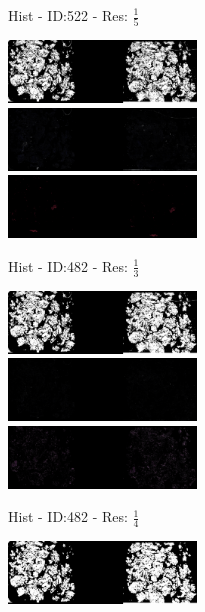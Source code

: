 \documentclass[letterpaper,10pt,oneside]{article}
\begin{document}
\begin{figure}[hbtp]
\begin{subfigure}[b]{5cm}
    \caption{Hist - ID:522 - Res: $\frac{1}{5}$}
  \end{subfigure}
  \begin{subfigure}[b]{5cm}
    \includegraphics[width=5cm]{visualization/results/histogramSeg/res_reduce_3/Region_0_PO14-00482B3_1_2_201404171123.png}
    \includegraphics[width=5cm]{visualization/results/histogramSeg/res_reduce_3/Region_1_PO14-00482B3_1_2_201404171123.png}
    \includegraphics[width=5cm]{visualization/results/histogramSeg/res_reduce_3/Region_2_PO14-00482B3_1_2_201404171123.png}
    \caption{Hist - ID:482 - Res: $\frac{1}{3}$}
  \end{subfigure}
  \begin{subfigure}[b]{5cm}
    \includegraphics[width=5cm]{visualization/results/histogramSeg/res_reduce_4/Region_0_PO14-00482B3_1_2_201404171123.png}
    \includegraphics[width=5cm]{visualization/results/histogramSeg/res_reduce_4/Region_1_PO14-00482B3_1_2_201404171123.png}
    \includegraphics[width=5cm]{visualization/results/histogramSeg/res_reduce_4/Region_2_PO14-00482B3_1_2_201404171123.png}
    \caption{Hist - ID:482 - Res: $\frac{1}{4}$}
  \end{subfigure}
  \begin{subfigure}[b]{5cm}
    \includegraphics[width=5cm]{visualization/results/histogramSeg/res_reduce_5/Region_0_PO14-00482B3_1_2_201404171123.png}

\end{subfigure}
\end{figure}
\end{document}
